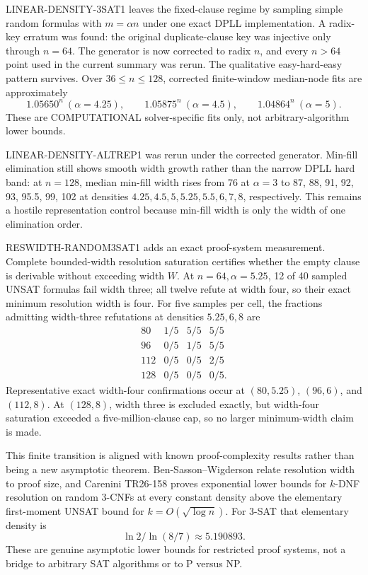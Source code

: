 \documentclass[11pt]{article}
\begin{document}
LINEAR-DENSITY-3SAT1 leaves the fixed-clause regime by sampling simple random formulas
with \(m=\alpha n\) under one exact DPLL implementation. A radix-key erratum was found:
the original duplicate-clause key was injective only through \(n=64\). The generator is now
corrected to radix \(n\), and every \(n>64\) point used in the current summary was rerun.
The qualitative easy-hard-easy pattern survives. Over \(36\le n\le128\), corrected
finite-window median-node fits are approximately
\[
1.05650^n\ (\alpha=4.25),\qquad
1.05875^n\ (\alpha=4.5),\qquad
1.04864^n\ (\alpha=5).
\]
These are COMPUTATIONAL solver-specific fits only, not arbitrary-algorithm lower bounds.

LINEAR-DENSITY-ALTREP1 was rerun under the corrected generator. Min-fill elimination still
shows smooth width growth rather than the narrow DPLL hard band: at \(n=128\), median
min-fill width rises from 76 at \(\alpha=3\) to 87, 88, 91, 92, 93, 95.5, 99, 102 at
densities \(4.25,4.5,5,5.25,5.5,6,7,8\), respectively. This remains a hostile
representation control because min-fill width is only the width of one elimination order.

RESWIDTH-RANDOM3SAT1 adds an exact proof-system measurement. Complete bounded-width
resolution saturation certifies whether the empty clause is derivable without exceeding
width \(W\). At \(n=64,\alpha=5.25\), 12 of 40 sampled UNSAT formulas fail width
three; all twelve refute at width four, so their exact minimum resolution width is four.
For five samples per cell, the fractions admitting width-three refutations at densities
\(5.25,6,8\) are
\[
\begin{array}{c|ccc}
80&1/5&5/5&5/5\\
96&0/5&1/5&5/5\\
112&0/5&0/5&2/5\\
128&0/5&0/5&0/5.
\end{array}
\]
Representative exact width-four confirmations occur at \((80,5.25)\), \((96,6)\),
and \((112,8)\). At \((128,8)\), width three is excluded exactly, but width-four
saturation exceeded a five-million-clause cap, so no larger minimum-width claim is made.

This finite transition is aligned with known proof-complexity results rather than being a
new asymptotic theorem. Ben-Sasson--Wigderson relate resolution width to proof size, and
Carenini TR26-158 proves exponential lower bounds for \(k\)-DNF resolution on random
3-CNFs at every constant density above the elementary first-moment UNSAT bound for
\(k=O(\sqrt{\log n})\). For 3-SAT that elementary density is
\[
\ln 2/\ln(8/7)\approx5.190893.
\]
These are genuine asymptotic lower bounds for restricted proof systems, not a bridge to
arbitrary SAT algorithms or to P versus NP.
\end{document}
